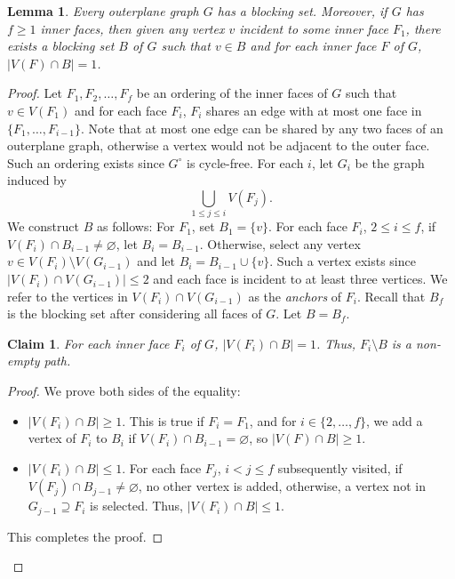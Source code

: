 \documentclass{patmorin}
\let\emptyset\varnothing
\newcommand{\wdual}[1]{#1^{\circ}}
\newtheorem{lemma}[theorem]{Lemma}
\newtheorem{claim}{Claim}[theorem]
\begin{document}
\begin{lemma}
 Every outerplane graph $G$ has a blocking set. Moreover, if $G$ has
 $f\ge 1$ inner faces,  then given any vertex $v$ incident to some inner
 face $F_1$, there exists a blocking set $B$ of $G$ such that $v \in B$
 and for each inner face $F$ of $G$, $|V(F) \cap B|=1$.
 \label{lem:blocking_out}
\end{lemma}
\begin{proof}
 Let $F_1,F_2,\ldots,F_{f}$ be an ordering of the inner faces of $G$ such that $v \in V(F_1)$ and for each face $F_i$, $F_i$ shares an edge with at most one face in $\{F_1,\ldots,F_{i-1}\}$. Note that at most one edge can be shared by any two faces of an outerplane graph, otherwise a vertex would not be adjacent to the outer face. 
 Such an ordering exists since $\wdual{G}$ is cycle-free. For each $i$, let $G_i$ be the graph induced by
 \begin{equation}
  \bigcup_{1 \leq j \leq i}V(F_j).
 \end{equation}
 We construct $B$ as follows: For $F_1$, set $B_1=\{v\}$. For each face $F_i$, $2 \leq i \leq f$, if $V(F_i) \cap B_{i-1} \not= \emptyset$, let $B_i = B_{i-1}$. Otherwise, select any vertex $v \in V(F_i) \setminus V(G_{i-1})$ and let $B_i = B_{i-1} \cup \{v\}$. Such a vertex exists since $|V(F_i) \cap V(G_{i-1})|\leq2$ and each face is incident to at least three vertices. We refer to the vertices in $V(F_i) \cap V(G_{i-1})$ as the \emph{anchors} of $F_i$. Recall that $B_f$ is the blocking set after considering all faces of $G$. Let $B=B_{f}$.
 
 \begin{claim}
  For each inner face $F_i$ of $G$, $|V(F_i) \cap B|=1$. Thus, $F_i \setminus B$ is a non-empty path.
  \label{claim:blocking_out_1}
 \end{claim}
 
 \begin{proof}
  We prove both sides of the equality:
  \begin{itemize}
   \item $|V(F_i) \cap B|\geq1$. This is true if $F_i=F_1$, and for $i \in \{2,\ldots,f\}$, we add a vertex of $F_i$ to $B_i$ if $V(F_i) \cap B_{i-1}=\emptyset$, so $|V(F) \cap B|\geq1$.
   \item $|V(F_i) \cap B|\leq1$. For each face $F_j$, $i < j \leq f$ subsequently visited, if $V(F_j) \cap B_{j-1} \not= \emptyset$, no other vertex is added, otherwise, a vertex not in $G_{j-1}\supseteq F_i$ is selected. Thus, $|V(F_i) \cap B|\leq1$. 
  \end{itemize}
  This completes the proof.
 \end{proof}
 

\end{proof}
\end{document}

